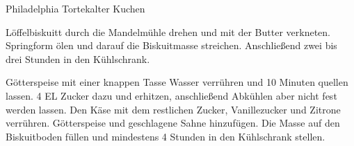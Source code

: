 \begin{recipe}{Philadelphia Torte}{kalter Kuchen}\label{Philadelphia Torte}


  \steps

  Löffelbiskuitt durch die Mandelmühle drehen und mit der Butter verkneten.
  Springform ölen und darauf die Biskuitmasse streichen. Anschließend zwei
  bis drei Stunden in den Kühlschrank.

  Götterspeise mit einer knappen Tasse Wasser verrühren und 10 Minuten
  quellen lassen. 4 EL Zucker dazu und erhitzen, anschließend Abkühlen aber
  nicht fest werden lassen. Den Käse mit dem restlichen Zucker, Vanillezucker
  und Zitrone verrühren. Götterspeise und geschlagene Sahne hinzufügen. Die
  Masse auf den Biskuitboden füllen und mindestens 4 Stunden in den
  Kühlschrank stellen.

\end{recipe}
